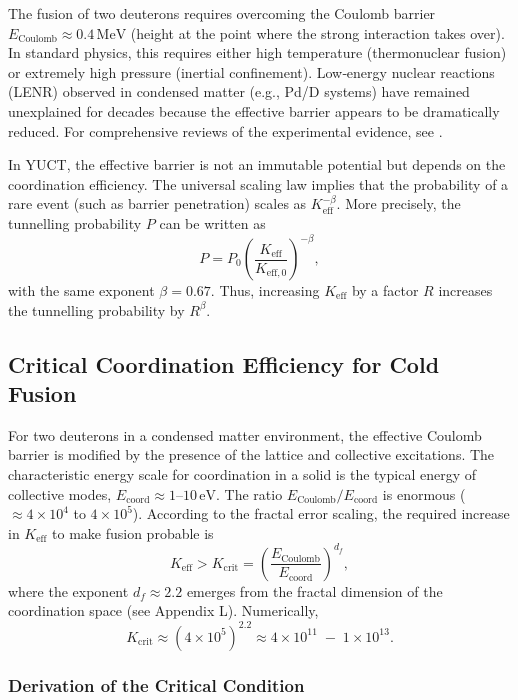 \documentclass[12pt]{article}
\theoremstyle{remark}
\newcommand{\Keff}{K_{\mathrm{eff}}}
\newcommand{\Keffzero}{K_{\mathrm{eff},0}}
\newcommand{\df}{d_{\!f}}
\newcommand{\Kcrit}{K_{\mathrm{crit}}}
\begin{document}
	The fusion of two deuterons requires overcoming the Coulomb barrier \(E_{\text{Coulomb}} \approx 0.4\,\text{MeV}\) (height at the point where the strong interaction takes over). In standard physics, this requires either high temperature (thermonuclear fusion) or extremely high pressure (inertial confinement). Low‑energy nuclear reactions (LENR) observed in condensed matter (e.g., Pd/D systems) have remained unexplained for decades because the effective barrier appears to be dramatically reduced. For comprehensive reviews of the experimental evidence, see \cite{Storms2014, Nagel2019}.
	
	In YUCT, the effective barrier is not an immutable potential but depends on the coordination efficiency. The universal scaling law implies that the probability of a rare event (such as barrier penetration) scales as \(\Keff^{-\beta}\). More precisely, the tunnelling probability \(P\) can be written as
	\begin{equation}
		P = P_0 \left( \frac{\Keff}{\Keffzero} \right)^{-\beta},
		\label{eq:tunnel}
	\end{equation}
	with the same exponent \(\beta = 0.67\). Thus, increasing \(\Keff\) by a factor \(R\) increases the tunnelling probability by \(R^{\beta}\).
	
	\subsection{Critical Coordination Efficiency for Cold Fusion}
	
	For two deuterons in a condensed matter environment, the effective Coulomb barrier is modified by the presence of the lattice and collective excitations. The characteristic energy scale for coordination in a solid is the typical energy of collective modes, \(E_{\mathrm{coord}} \approx 1\)–\(10\,\text{eV}\). The ratio \(E_{\text{Coulomb}}/E_{\mathrm{coord}}\) is enormous (\(\approx 4\times10^4\) to \(4\times10^5\)). According to the fractal error scaling, the required increase in \(\Keff\) to make fusion probable is
	\begin{equation}
		\Keff > \Kcrit = \left( \frac{E_{\text{Coulomb}}}{E_{\mathrm{coord}}} \right)^{\df},
		\label{eq:Kcrit}
	\end{equation}
	where the exponent \(\df \approx 2.2\) emerges from the fractal dimension of the coordination space (see Appendix L). Numerically,
	\[
	\Kcrit \approx (4\times10^5)^{2.2} \approx 4\times10^{11} \;-\; 1\times10^{13}.
	\]
	
	\subsubsection{Derivation of the Critical Condition}
	
\end{document}
